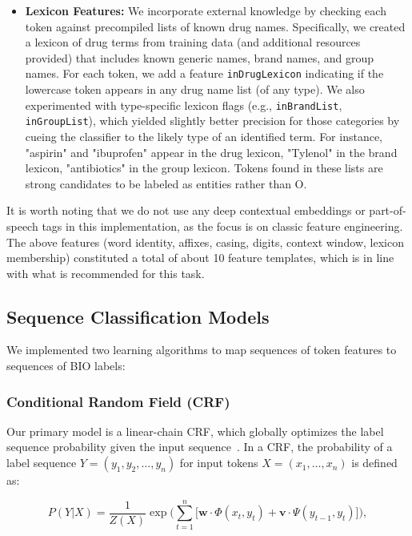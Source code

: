 \begin{itemize}
    \item \textbf{Lexicon Features:} We incorporate external knowledge by checking each token against precompiled lists of known drug names. Specifically, we created a lexicon of drug terms from training data (and additional resources provided) that includes known generic names, brand names, and group names. For each token, we add a feature \texttt{inDrugLexicon} indicating if the lowercase token appears in any drug name list (of any type). We also experimented with type-specific lexicon flags (e.g., \texttt{inBrandList}, \texttt{inGroupList}), which yielded slightly better precision for those categories by cueing the classifier to the likely type of an identified term. For instance, "aspirin" and "ibuprofen" appear in the drug lexicon, "Tylenol" in the brand lexicon, "antibiotics" in the group lexicon. Tokens found in these lists are strong candidates to be labeled as entities rather than O.
\end{itemize}

It is worth noting that we do not use any deep contextual embeddings or part-of-speech tags in this implementation, as the focus is on classic feature engineering. The above features (word identity, affixes, casing, digits, context window, lexicon membership) constituted a total of about 10 feature templates, which is in line with what is recommended for this task.

\subsection{Sequence Classification Models}
We implemented two learning algorithms to map sequences of token features to sequences of BIO labels:

\subsubsection{Conditional Random Field (CRF)}
Our primary model is a linear-chain CRF, which globally optimizes the label sequence probability given the input sequence~\cite{crf-tutorial}. In a CRF, the probability of a label sequence $Y = (y_1, y_2, \ldots, y_n)$ for input tokens $X = (x_1,\ldots,x_n)$ is defined as:

\begin{equation}
P(Y|X) = \frac{1}{Z(X)} \exp\Big(\sum_{t=1}^n \big[ \mathbf{w} \cdot \Phi(x_t, y_t) + \mathbf{v} \cdot \Psi(y_{t-1}, y_t) \big]\Big),
\end{equation}


